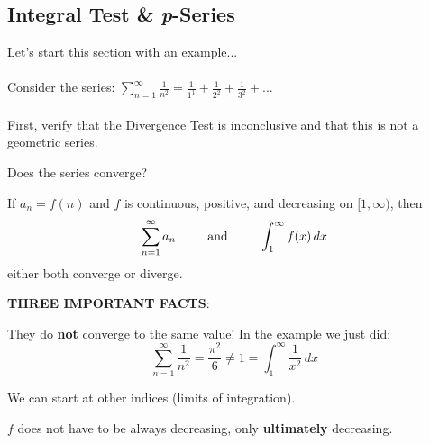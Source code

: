 \subsection*{Integral Test \& \textit{p}-Series}
Let's start this section with an example...\\
\\
Consider the series: $\displaystyle\sum_{n=1}^\infty \frac{1}{n^2}=\frac{1}{1^1}+\frac{1}{2^2}+\frac{1}{3^2}+...$\\
\\
First, verify that the Divergence Test is inconclusive and that this is not a geometric series.\\


Does the series converge?


\newpage

\begin{tcolorbox}[title= THE INTEGRAL TEST,colframe=black,sharp corners,colback=white,colbacktitle=white,coltitle=black]

    If $a_n=f(n)$ and $f$ is continuous, positive, and decreasing on $[1,\infty)$, then
    \[\sum_{n=1}^{\infty}a_n\hspace{.35in}\text{and}\hspace{.35in} \int_1^{\infty}f(x)\,dx\]
    either both converge or diverge.

\end{tcolorbox}
\vspace{.1in}

\noindent\textbf{THREE IMPORTANT FACTS}:
\begin{questions}
    \question They do \textbf{not} converge to the same value! In the example we just did:
    \[\displaystyle\sum_{n=1}^\infty \frac{1}{n^2}=\frac{\pi^2}{6}\ne1=\int_1^\infty\frac{1}{x^2}\,dx\]
    
    \question We can start at other indices (limits of integration).
    
    \question $f$ does not have to be always decreasing, only \textbf{ultimately} decreasing.
\end{questions}
\vspace{.1in}

